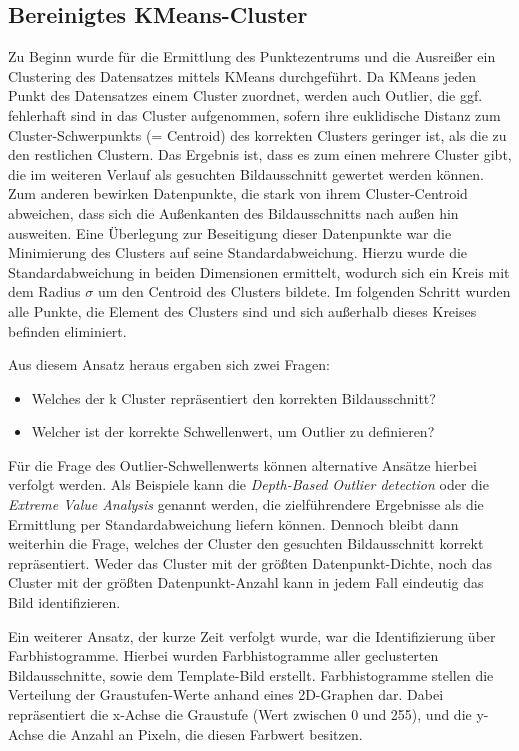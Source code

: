 \documentclass[
    type=Projektarbeit,
    status=draft, %
    language=german, %
    bibengine=bibtex,
]{unibwm-inf-thesis}
\begin{document}
    \subsection{Bereinigtes KMeans-Cluster}
    Zu Beginn wurde für die Ermittlung des Punktezentrums und die Ausreißer ein Clustering des Datensatzes mittels KMeans durchgeführt.
    Da KMeans jeden Punkt des Datensatzes einem Cluster zuordnet, werden auch Outlier, die ggf. fehlerhaft sind in das Cluster aufgenommen,
    sofern ihre euklidische Distanz zum Cluster-Schwerpunkts (= Centroid) des korrekten Clusters geringer ist, als die zu den restlichen Clustern.
    Das Ergebnis ist, dass es zum einen mehrere Cluster gibt, die im weiteren Verlauf als gesuchten Bildausschnitt gewertet werden können.
    Zum anderen bewirken Datenpunkte, die stark von ihrem Cluster-Centroid abweichen, dass sich die Außenkanten des Bildausschnitts nach außen hin ausweiten.
    Eine Überlegung zur Beseitigung dieser Datenpunkte war die Minimierung des Clusters auf seine Standardabweichung.
    Hierzu wurde die Standardabweichung in beiden Dimensionen ermittelt, wodurch sich ein Kreis mit dem Radius $\sigma$ um den Centroid des Clusters bildete.
    Im folgenden Schritt wurden alle Punkte, die Element des Clusters sind und sich außerhalb dieses Kreises befinden eliminiert.

    Aus diesem Ansatz heraus ergaben sich zwei Fragen:
    \begin{itemize}
        \item Welches der k Cluster repräsentiert den korrekten Bildausschnitt?
        \item Welcher ist der korrekte Schwellenwert, um Outlier zu definieren?
    \end{itemize}

    Für die Frage des Outlier-Schwellenwerts können alternative Ansätze hierbei verfolgt werden.
    Als Beispiele kann die \textit{Depth-Based Outlier detection} oder die \textit{Extreme Value Analysis} genannt werden, die zielführendere Ergebnisse als die Ermittlung per Standardabweichung liefern können.
    Dennoch bleibt dann weiterhin die Frage, welches der Cluster den gesuchten Bildausschnitt korrekt repräsentiert.
    Weder das Cluster mit der größten Datenpunkt-Dichte, noch das Cluster mit der größten Datenpunkt-Anzahl kann in jedem Fall eindeutig das Bild identifizieren.

    Ein weiterer Ansatz, der kurze Zeit verfolgt wurde, war die Identifizierung über Farbhistogramme.
    Hierbei wurden Farbhistogramme aller geclusterten Bildausschnitte, sowie dem Template-Bild erstellt.
    Farbhistogramme stellen die Verteilung der Graustufen-Werte anhand eines 2D-Graphen dar.
    Dabei repräsentiert die x-Achse die Graustufe (Wert zwischen 0 und 255), und die y-Achse die Anzahl an Pixeln, die diesen Farbwert besitzen.
\end{document}
